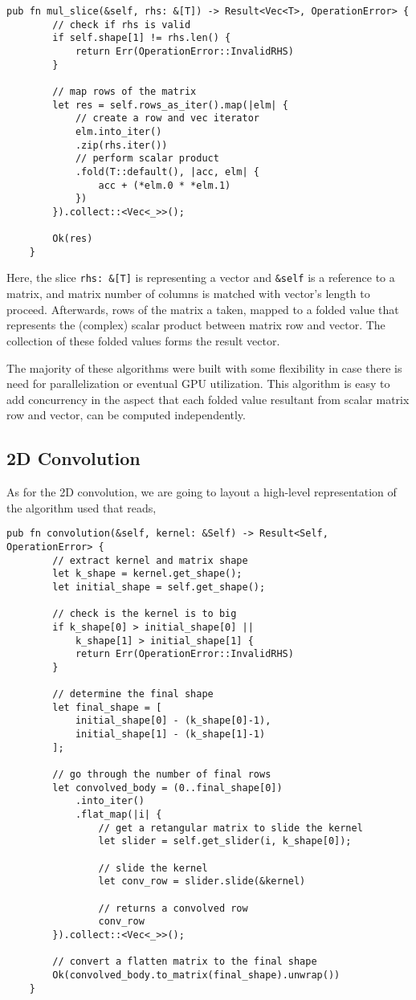 \begin{lstlisting}[caption=Implementation in Rust of Matrix-Vector.]
	pub fn mul_slice(&self, rhs: &[T]) -> Result<Vec<T>, OperationError> {
		// check if rhs is valid
		if self.shape[1] != rhs.len() { 
			return Err(OperationError::InvalidRHS)
		}
		
		// map rows of the matrix
		let res = self.rows_as_iter().map(|elm| {
			// create a row and vec iterator
			elm.into_iter()
			.zip(rhs.iter())
			// perform scalar product
			.fold(T::default(), |acc, elm| { 
				acc + (*elm.0 * *elm.1) 
			})
		}).collect::<Vec<_>>();
		
		Ok(res)
	}
\end{lstlisting}

Here, the slice \texttt{rhs: \&[T]}  is representing a vector and \texttt{\&self} is a reference to a matrix, and matrix number of columns is matched with vector's length to proceed. Afterwards, rows of the matrix a taken, mapped to a folded value that represents the (complex) scalar product between matrix row and vector. The collection of these folded values forms the result vector.

The majority of these algorithms were built with some flexibility in case there is need for parallelization or eventual GPU utilization. This algorithm is easy to add concurrency  in the aspect that each folded value resultant from scalar matrix row and vector, can be computed independently.

\subsection{2D Convolution}

As for the 2D convolution, we are going to layout a high-level representation of the algorithm used that reads,

\begin{lstlisting}[caption=Implementation in Rust of Convolutional Product.]
	pub fn convolution(&self, kernel: &Self) -> Result<Self, OperationError> {
		// extract kernel and matrix shape
		let k_shape = kernel.get_shape();
		let initial_shape = self.get_shape();
		
		// check is the kernel is to big
		if k_shape[0] > initial_shape[0] || 
			k_shape[1] > initial_shape[1] {
			return Err(OperationError::InvalidRHS)
		}
		
		// determine the final shape
		let final_shape = [
			initial_shape[0] - (k_shape[0]-1), 
			initial_shape[1] - (k_shape[1]-1)
		];
		
		// go through the number of final rows
		let convolved_body = (0..final_shape[0])
			.into_iter()
			.flat_map(|i| {
				// get a retangular matrix to slide the kernel
				let slider = self.get_slider(i, k_shape[0]);
				
				// slide the kernel
				let conv_row = slider.slide(&kernel)
				
				// returns a convolved row
				conv_row
		}).collect::<Vec<_>>();
		
		// convert a flatten matrix to the final shape
		Ok(convolved_body.to_matrix(final_shape).unwrap())
	}
\end{lstlisting}

